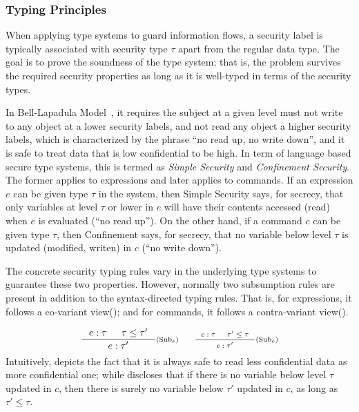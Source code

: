 \subsubsection{Typing Principles}

When applying type systems to guard information flows, a security label is typically associated with security type $\tau$ apart from the regular data type. The goal is to prove the soundness of the type system; that is, the problem survives the required security properties as long as it is well-typed in terms of the security types.

In Bell-Lapadula Model~\cite{bell1973}, it requires the subject at a given level must not write to any object at a lower security labels, and not read any object a higher security labels, which is characterized by the phrase ``no read up, no write down'', and it is safe to treat data that is low confidential to be high. In term of language based secure type systems, this is termed as \emph{Simple Security} and \emph{Confinement Security}. The former applies to expressions and later applies to commands. If an expression $e$ can be given type $\tau$ in the system, then Simple Security says, for secrecy, that only variables at level $\tau$ or lower in $e$ will have their contents accessed (read) when $e$ is evaluated (``no read up''). On the other hand, if a command $c$ can be given type $\tau$, then Confinement says, for secrecy, that no variable below level $\tau$ is updated (modified, writen) in $c$ (``no write down'').

The concrete security typing rules vary in the underlying type systems to guarantee these two properties. However, normally two subsumption rules are present in addition to the syntax-directed typing rules. That is, for expressions, it follows a co-variant view(); and for commands, it follows a contra-variant view().

{\myeqsize\begin{equation*}
\inference
{e:\tau & \tau\leq\tau'}
{e:\tau'}
\ruleTagMath{Sub$_e$}
\qquad
\inference
{c:\tau & \tau'\leq\tau}
{c:\tau'}
\ruleTagMath{Sub$_c$}
\end{equation*}}
Intuitively,  depicts the fact that it is always safe to read less confidential data as more confidential one; while  discloses that if there is no variable below level $\tau$ updated in $c$, then there is surely no variable below $\tau'$ updated in $c$, as long as $\tau'\leq\tau$.


